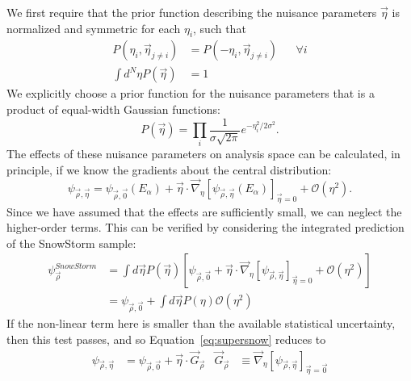 \documentclass[main.tex]{subfiles}
\begin{document}
We first require that the prior function describing the nuisance parameters $\vec{\eta}$ is normalized and symmetric for each $\eta_{i}$, such that 
\begin{align}
    P(\eta_{i}, \vec{\eta}_{j\neq i}) &= P(-\eta_{i},\vec{\eta}_{j\neq i}) & &\forall i\\
    \int d^{N}\eta P(\vec{\eta}) &= 1
\end{align}
We explicitly choose a prior function for the nuisance parameters that is a product of equal-width Gaussian functions:
\begin{equation}
    P(\vec{\eta}) = \prod_{i} \dfrac{1}{\sigma \sqrt{2\pi}} e^{-\eta_{i}^{2}/2\sigma^{2}}.
\end{equation}
The effects of these nuisance parameters on analysis space can be calculated, in principle, if we know the gradients about the central distribution:
\begin{equation}\label{eq:supersnow}
    \psi_{\vec{\rho}, \vec{\eta}} = \psi_{\vec{\rho}, \vec{0}}(E_{\alpha}) + \vec{\eta}\cdot\vec{\nabla}_{\eta}\left[\psi_{\vec{\rho}, \vec{\eta}}(E_{\alpha})\right]_{\vec{\eta}=0} + \mathcal{O}(\eta^{2}).
\end{equation}
Since we have assumed that the effects are sufficiently small, we can neglect the higher-order terms. 
This can be verified by considering the integrated prediction of the SnowStorm sample:
\begin{align}
    \psi_{\vec{\rho}}^{SnowStorm} &= \int d \vec{\eta} P(\vec{\eta})\left[ \psi_{\vec{\rho}, \vec{0}} + \vec{\eta}\cdot\vec{\nabla}_{\eta}\left[\psi_{\vec{\rho}, \vec{\eta}} \right]_{\vec{\eta}=0} + \mathcal{O}(\eta^{2}) \right] \\
    &= \psi_{\vec{\rho}, \vec{0}}  + \int d\vec{\eta} P(\eta)\mathcal{O}(\eta^{2})
\end{align}
If the non-linear term here is smaller than the available statistical uncertainty, then this test passes, and so Equation~\eqref{eq:supersnow} reduces to
\begin{align} 
\psi_{\vec{\rho}, \vec{\eta}}&= \psi_{\vec{\rho}, \vec{0}} + \vec{\eta}\cdot\vec{G}_{\vec{\rho}} & \vec{G}_{\vec{\rho}}&\equiv \vec{\nabla}_{\eta}\left[\psi_{\vec{\rho}, \vec{\eta}}\right]_{\vec{\eta} =\vec{0}}
\end{align}
\end{document}
